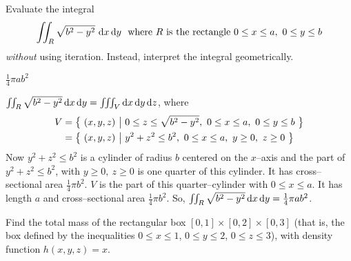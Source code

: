 


\subsection*{\Conceptual}

\begin{question}
Evaluate the integral 
\begin{equation*}
\text{$\iint_R \sqrt{b^2-y^2}\ \mathrm{d}x\,\mathrm{d}y$\ \  
where $R$ is the rectangle  $0\le x\le a,\ 0\le y\le b$}
\end{equation*}
\emph{without} using iteration. Instead, interpret the integral 
geometrically.
\end{question}

%

\begin{answer}
$\frac{1}{4}\pi ab^2$
\end{answer}

\begin{solution}
$\iint_R \sqrt{b^2-y^2}\,\mathrm{d}x\,\mathrm{d}y
=\iiint_V \mathrm{d}x\,\mathrm{d}y\,\mathrm{d}z$, where 
\begin{align*}
V&=\big\{ \ (x,y,z)\ \big|\ 0\le z\le\sqrt{b^2-y^2},\  0\le x\le a,\  0\le y\le b\ \big\} \\
 &=\big\{ \ (x,y,z)\ \big|\ y^2+z^2\le b^2,\  0\le x\le a,\  y\ge 0,\ z\ge 0\ \big\}
\end{align*}
Now $y^2+z^2\le b^2$ is a cylinder of radius $b$ centered on the $x$--axis and the part of $y^2+z^2\le b^2$, with $y\ge0,\ z\ge0$ is one quarter of this cylinder.
It has cross--sectional area $\frac{1}{4}\pi b^2$. $V$ is the part of
this quarter--cylinder with $0\le x\le a$. It has length $a$ and 
cross--sectional area $\frac{1}{4}\pi b^2$. So, 
$\iint_R \sqrt{b^2-y^2}\,\mathrm{d}x\,\mathrm{d}y=\frac{1}{4}\pi ab^2$.
\end{solution}


\begin{question}[M200 2013D] %
Find the total mass of the rectangular box 
$[0, 1] \times [0, 2] \times [0, 3]$ (that is, the box
defined by the inequalities $0 \le x \le 1$, $0 \le y \le 2$, 
$0 \le z \le 3$), with density function $h(x, y, z) = x$.
\end{question}

%

